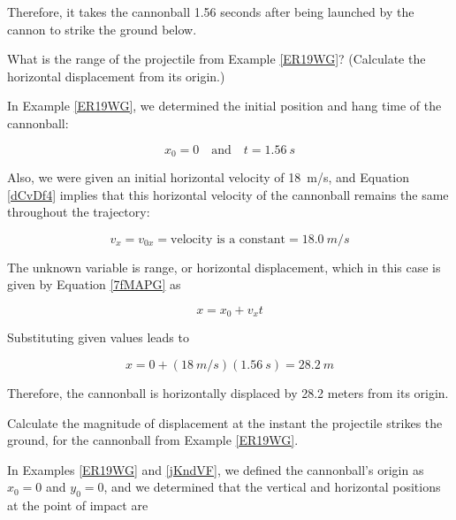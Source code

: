 \documentclass[main-physics.tex]{subfiles}
\begin{document}
Therefore, it takes the cannonball 1.56 seconds after being launched by the cannon to strike the ground below. 

\endsolution

\begin{example} \label{jKndVF}
    What is the range of the projectile from Example \ref{ER19WG}? (Calculate the horizontal displacement from its origin.)
\end{example}

\Solution In Example \ref{ER19WG}, we determined the initial position and hang time of the cannonball:

\begin{equation*}
    x_0 = 0 \quad \text{and} \quad t = \SI{1.56}{s}
\end{equation*}

Also, we were given an initial horizontal velocity of \SI{18}{m/s}, and Equation \eqref{dCvDf4} implies that this horizontal velocity of the cannonball remains the same throughout the trajectory:

\begin{equation*}
    v_x = v_{0x} = \text{velocity is a constant} = \SI{18.0}{m/s}
\end{equation*}

The unknown variable is range, or horizontal displacement, which in this case is given by Equation \eqref{7fMAPG} as

\begin{equation*}
    x = x_0 + v_x t
\end{equation*}

Substituting given values leads to 

\begin{equation*}
    x = 0 + (\SI{18}{m/s})(\SI{1.56}{s}) = \SI{28.2}{m}
\end{equation*}

Therefore, the cannonball is horizontally displaced by 28.2 meters from its origin.

\endsolution

\begin{example}
    Calculate the magnitude of displacement at the instant the projectile strikes the ground, for the cannonball from Example \ref{ER19WG}.
\end{example}

\Solution In Examples \ref{ER19WG} and \ref{jKndVF}, we defined the cannonball's origin as $x_0 = 0$ and $y_0 = 0$, and we determined that the vertical and horizontal positions at the point of impact are
\end{document}
